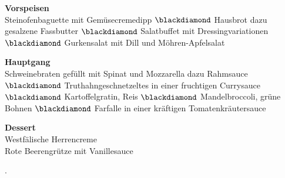 \Centering
\vspace{0.3em}
	\noindent \textbf{Vorspeisen}\\
	Steinofenbaguette mit Gemüsecremedipp $\blackdiamond$ Hausbrot dazu gesalzene Fassbutter $\blackdiamond$ 
	Salatbuffet mit Dressingvariationen $\blackdiamond$
	Gurkensalat mit Dill und Möhren-Apfelsalat
	
	\noindent \textbf{Hauptgang}\\
	Schweinebraten gefüllt mit Spinat und Mozzarella dazu Rahmsauce $\blackdiamond$
	Truthahngeschnetzeltes in einer fruchtigen Currysauce $\blackdiamond$
	Kartoffelgratin, Reis $\blackdiamond$
	Mandelbroccoli, grüne Bohnen $\blackdiamond$
	Farfalle in einer kräftigen Tomatenkräutersauce
	
	\noindent \textbf{Dessert}\\
	Westfälische Herrencreme \\
	Rote Beerengrütze mit Vanillesauce

\justifying.


